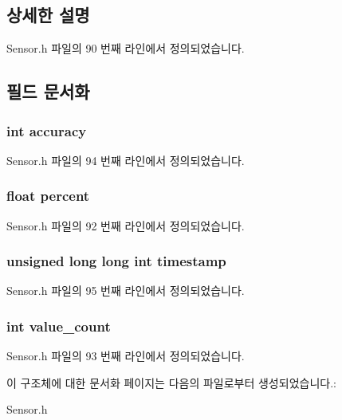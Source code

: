\subsection{상세한 설명}


Sensor.\-h 파일의 90 번째 라인에서 정의되었습니다.



\subsection{필드 문서화}
\hypertarget{struct___humidity__data_a5565cf9073275f9713f9016e7c10d25f}{
\subsubsection[{accuracy}]{\setlength{\rightskip}{0pt plus 5cm}int accuracy}}\label{struct___humidity__data_a5565cf9073275f9713f9016e7c10d25f}


Sensor.\-h 파일의 94 번째 라인에서 정의되었습니다.

\hypertarget{struct___humidity__data_aac167f3972a2f244f4b32c8ee5b89364}{
\subsubsection[{percent}]{\setlength{\rightskip}{0pt plus 5cm}float percent}}\label{struct___humidity__data_aac167f3972a2f244f4b32c8ee5b89364}


Sensor.\-h 파일의 92 번째 라인에서 정의되었습니다.

\hypertarget{struct___humidity__data_a8de02c4128636a7bf630ff5428f60c8d}{
\subsubsection[{timestamp}]{\setlength{\rightskip}{0pt plus 5cm}unsigned long long int timestamp}}\label{struct___humidity__data_a8de02c4128636a7bf630ff5428f60c8d}


Sensor.\-h 파일의 95 번째 라인에서 정의되었습니다.

\hypertarget{struct___humidity__data_a40a079bfc72408819dc78da308203a74}{
\subsubsection[{value\-\_\-count}]{\setlength{\rightskip}{0pt plus 5cm}int value\-\_\-count}}\label{struct___humidity__data_a40a079bfc72408819dc78da308203a74}


Sensor.\-h 파일의 93 번째 라인에서 정의되었습니다.



이 구조체에 대한 문서화 페이지는 다음의 파일로부터 생성되었습니다.\-:\begin{DoxyCompactItemize}
\item 
Sensor.\-h\end{DoxyCompactItemize}
